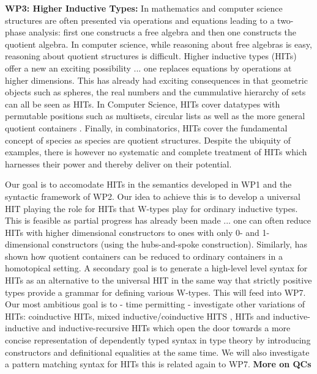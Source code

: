 \documentclass[a4paper,11pt]{article}
\begin{document}

{\bf WP3: Higher Inductive Types:} In mathematics and computer science
structures are often presented via operations and equations leading to
a two-phase analysis: first one constructs a free algebra and then one
constructs the quotient algebra. In computer science, while reasoning
about free algebras is easy, reasoning about quotient structures is
difficult. Higher inductive types (HITs) offer a new an exciting
possibility ... one replaces equations by operations at higher
dimensions. This has already had exciting consequences in that
geometric objects such as spheres, the real numbers and the
cummulative hierarchy of sets can all be seen as HITs.  In Computer
Science, HITs cover datatypes with permutable positions such as
multisets, circular lists as well as the more general quotient
containers \cite{abottAltenGhaniMcB:quotientContainers, EPSRC
  Containers}. Finally, in combinatorics, HITs cover the fundamental
concept of species as species are quotient structures. Despite the
ubiquity of examples, there is however no systematic and complete
treatment of HITs which harnesses their power and thereby deliver on
their potential.

Our goal is to accomodate HITs in the semantics developed in WP1 and
the syntactic framework of WP2. Our idea to achieve this is to develop
a universal HIT playing the role for HITs that W-types play for
ordinary inductive types. This is feasible as partial progress has
already been made ... one can often reduce HITs with higher
dimensional constructors to ones with only 0- and 1-dimensional
constructors (using the hubs-and-spoke construction). 
Similarly, \cite{gylterud:thesis,kock:groupoids} has shown how quotient 
containers can be reduced to ordinary containers in a homotopical 
setting. A secondary goal
is to generate a high-level level syntax for HITs as an alternative to
the universal HIT in the same way that strictly positive types provide
a grammar for defining various W-types. This will feed into WP7.  Our
most ambitious goal is to - time permitting - investigate other
variations of HITs: coinductive HITs, mixed inductive/coinductive HITS
\cite{txa-nisse}, HITs and inductive-inductive and inductive-recursive
HITs which open the door towards a more concise representation of
dependently typed syntax in type theory \cite{chapman2009type} by
introducing constructors and definitional equalities at the same
time. We will also investigate a pattern matching syntax for HITs this
is related again to WP7. {\bf More on QCs}
\end{document}
